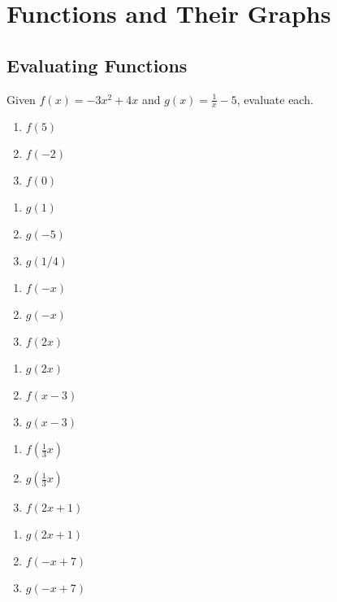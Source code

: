 \chapter{Functions and Their Graphs}

\section{Evaluating Functions}

Given $f(x) = -3x^2 + 4x$ and $g(x) = \frac{1}{x}-5$, evaluate each.
\begin{multicols}{3}
\begin{enumerate}
	\item $f(5)$
	\item $f(-2)$
	\item $f(0)$
\end{enumerate}	\setcounter{Review}{\value{enumi}}
\end{multicols}
\begin{multicols}{3}
\begin{enumerate}	\setcounter{enumi}{\value{Review}}
	\item $g(1)$
	\item $g(-5)$
	\item $g(1/4)$
\end{enumerate}	\setcounter{Review}{\value{enumi}}
\end{multicols}
\begin{multicols}{3}
\begin{enumerate}	\setcounter{enumi}{\value{Review}}
	\item $f(-x)$
	\item $g(-x)$
	\item $f(2x)$
\end{enumerate}	\setcounter{Review}{\value{enumi}}
\end{multicols}
\begin{multicols}{3}
\begin{enumerate}	\setcounter{enumi}{\value{Review}}
	\item $g(2x)$
	\item $f(x-3)$
	\item $g(x-3)$
\end{enumerate}	\setcounter{Review}{\value{enumi}}
\end{multicols}
\begin{multicols}{3}
\begin{enumerate}	\setcounter{enumi}{\value{Review}}
	\item $f\left(\frac{1}{3}x\right)$
	\item $g\left(\frac{1}{3}x\right)$
	\item $f(2x+1)$
\end{enumerate}	\setcounter{Review}{\value{enumi}}
\end{multicols}
\begin{multicols}{3}
\begin{enumerate}	\setcounter{enumi}{\value{Review}}
	\item $g(2x+1)$
	\item $f(-x+7)$
	\item $g(-x+7)$
\end{enumerate}
\end{multicols}

